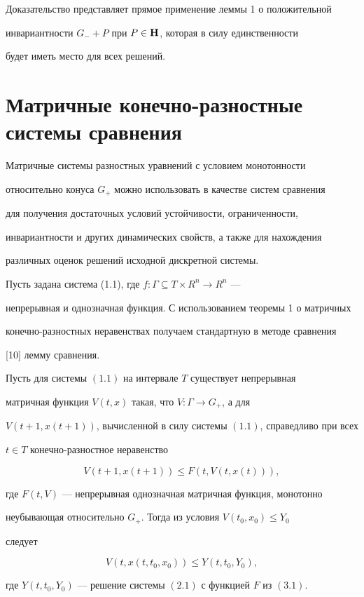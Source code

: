 Доказательство представляет прямое применение леммы 1 о положительной


инвариантности $G_-+P$ при $P\in\bold H$, которая в силу единственности


будет иметь место для всех решений.








\section{Матричные конечно-разностные системы сравнения}





Матричные системы разностных уравнений с условием монотонности


относительно конуса $G_+$ можно использовать в качестве систем сравнения


для получения достаточных условий устойчивости, ограниченности,


инвариантности и других динамических свойств, а также для нахождения


различных оценок решений исходной дискретной системы.





Пусть задана система (1.1), где $f:\Gamma\subseteq T\times R^n\to R^n$ ---


непрерывная и однозначная функция. С использованием теоремы 1 о матричных


конечно-разностных неравенствах получаем стандартную в методе сравнения


[10] лемму сравнения.





\begin{lem}


Пусть для системы $(1.1)$ на интервале $T$ существует непрерывная


матричная функция $V(t,x)$ такая, что $V:\Gamma\to G_+$, а для


$V(t+1,x(t+1))$, вычисленной в силу системы $(1.1)$, справедливо при всех


$t\in T$ конечно-разностное неравенство


\begin{equation}


V(t+1,x(t+1))\le F(t,V(t,x(t))),


\end{equation}


где $F(t,V)$ --- непрерывная однозначная матричная функция, монотонно


неубывающая относительно $G_+$. Тогда из условия $V(t_0,x_0)\le Y_0$


следует


$$


V(t,x(t,t_0,x_0))\le Y(t,t_0,Y_0),


$$


где $Y(t,t_0,Y_0)$ --- решение системы $(2.1)$ с функцией $F$ из $(3.1)$.


\end{lem}





